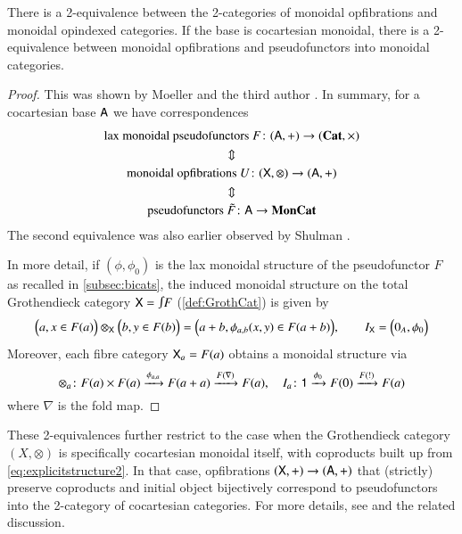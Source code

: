 \documentclass[reqno]{amsart}
\begin{document}
\begin{lem}\label{lem:MonGroth}
There is a 2-equivalence between the 2-categories of monoidal opfibrations and monoidal opindexed categories. If the base is cocartesian monoidal, there is a 2-equivalence between monoidal opfibrations and pseudofunctors into monoidal categories. 
\end{lem}

\begin{proof}
This was shown by Moeller and the third author \cite[Theorems~3.13\&4.2]{MV}. In summary, for a cocartesian base $\mathsf{A}$ we have correspondences
\begin{gather}
\textrm{lax monoidal pseudofunctors }F\colon(\mathsf{A},+)\to(\mathbf{Cat},\times) \notag\\
\Updownarrow \notag\\
\textrm{monoidal opfibrations }U\colon(\mathsf{X},\otimes)\to(\mathsf{A},+) \notag\\
\Updownarrow \notag\\
\textrm{pseudofunctors } \tilde{F} \colon \mathsf{A}\to\mathbf{MonCat} \notag
\end{gather}
The second equivalence was also earlier observed by Shulman \cite{Shulman2008}.

In more detail, if $(\phi,\phi_0)$ is the lax monoidal structure of the pseudofunctor $F$ as recalled in \cref{subsec:bicats}, the induced monoidal structure on the total Grothendieck category $\X=\inta F$ (\cref{def:GrothCat}) is given by
\begin{equation}\label{eq:explicitstructure2}
\Big(a,x\in F(a)\Big)\otimes_{\mathsf{X}}\Big(b,y\in F(b)\Big)=\Big(a+b,\phi_{a,b}(x,y)\in F(a+b)\Big), \qquad I_{\mathsf{X}}=\Big(0_A,\phi_0\Big)
\end{equation}
Moreover, each fibre category $\mathsf{X}_a=F(a)$ obtains a monoidal structure via 
\begin{equation}\label{eq:explicitstructure1}
\otimes_a\colon F(a)\times F(a)\xrightarrow{\phi_{a,a}}F(a+a)\xrightarrow{F(\nabla)}F(a),\quad
I_a\colon\mathsf{1}\xrightarrow{\phi_0}F(0)\xrightarrow{F(!)}F(a)
\end{equation}
where $\nabla$ is the fold map. 
\end{proof}

These 2-equivalences further restrict to the case when the Grothendieck category $(X,\otimes)$ is specifically cocartesian monoidal itself, with coproducts built up from \cref{eq:explicitstructure2}. In that case, opfibrations $(\mathsf{X},+)\to(\mathsf{A},+)$ that (strictly) preserve coproducts and initial object bijectively correspond to pseudofunctors into the 2-category of cocartesian categories.  For more details, see \cite[Corollary 4.7]{MV} and the related discussion.
\end{document}
